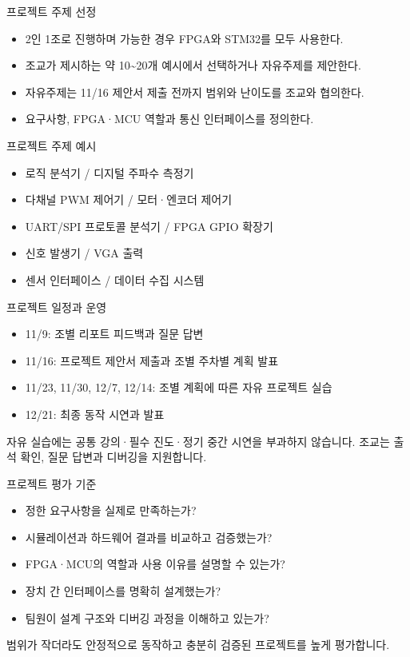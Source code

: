 \documentclass[aspectratio=169,11pt,t]{beamer}
\begin{document}
\begin{frame}{프로젝트 주제 선정}
\begin{itemize}
\item 2인 1조로 진행하며 가능한 경우 FPGA와 STM32를 모두 사용한다.
\item 조교가 제시하는 약 10\textasciitilde{}20개 예시에서 선택하거나 자유주제를 제안한다.
\item 자유주제는 11/16 제안서 제출 전까지 범위와 난이도를 조교와 협의한다.
\item 요구사항, FPGA·MCU 역할과 통신 인터페이스를 정의한다.
\end{itemize}
\end{frame}

\begin{frame}{프로젝트 주제 예시}
\begin{itemize}
\item 로직 분석기 / 디지털 주파수 측정기
\item 다채널 PWM 제어기 / 모터·엔코더 제어기
\item UART/SPI 프로토콜 분석기 / FPGA GPIO 확장기
\item 신호 발생기 / VGA 출력
\item 센서 인터페이스 / 데이터 수집 시스템
\end{itemize}
\end{frame}

\begin{frame}{프로젝트 일정과 운영}
\begin{itemize}
\item 11/9: 조별 리포트 피드백과 질문 답변
\item 11/16: 프로젝트 제안서 제출과 조별 주차별 계획 발표
\item 11/23, 11/30, 12/7, 12/14: 조별 계획에 따른 자유 프로젝트 실습
\item 12/21: 최종 동작 시연과 발표
\end{itemize}
\vspace{0.35cm}
자유 실습에는 공통 강의·필수 진도·정기 중간 시연을 부과하지 않습니다. 조교는 출석 확인, 질문 답변과 디버깅을 지원합니다.
\end{frame}

\begin{frame}{프로젝트 평가 기준}
\begin{itemize}
\item 정한 요구사항을 실제로 만족하는가?
\item 시뮬레이션과 하드웨어 결과를 비교하고 검증했는가?
\item FPGA·MCU의 역할과 사용 이유를 설명할 수 있는가?
\item 장치 간 인터페이스를 명확히 설계했는가?
\item 팀원이 설계 구조와 디버깅 과정을 이해하고 있는가?
\end{itemize}
\vspace{0.35cm}
범위가 작더라도 안정적으로 동작하고 충분히 검증된 프로젝트를 높게 평가합니다.
\end{frame}
\end{document}
